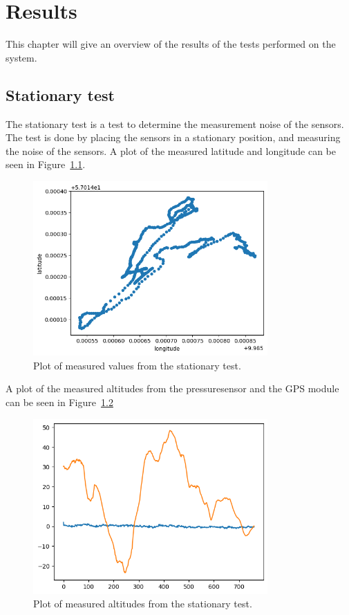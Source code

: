 \chapter{Results}\label{ch:results}
This chapter will give an overview of the results of the tests performed on the system.

\section{Stationary test}\label{sec:stationary-test}
The stationary test is a test to determine the measurement noise of the sensors.
The test is done by placing the sensors in a stationary position, and measuring the noise of the sensors.
A plot of the measured latitude and longitude can be seen in Figure~\ref{fig:stationary-test}.

\begin{figure}[H]
    \centering
    \includegraphics[width=0.8\textwidth]{chapters/05Results/figures/output}
    \caption{Plot of measured values from the stationary test.}
    \label{fig:stationary-test}
\end{figure}

A plot of the measured altitudes from the pressuresensor and the GPS module can be seen in Figure~\ref{fig:altitude-test}

\begin{figure}
    \centering
    \includegraphics[width=0.8\textwidth]{chapters/05Results/figures/altitude}
    \caption{Plot of measured altitudes from the stationary test.}
    \label{fig:altitude-test}
\end{figure}



